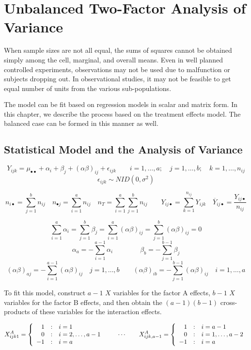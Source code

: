 \documentclass[
]{book}
\begin{document}
\chapter{Unbalanced Two-Factor Analysis of
Variance}\label{unbalanced-two-factor-analysis-of-variance}

When sample sizes are not all equal, the sums of squares cannot be
obtained simply among the cell, marginal, and overall means. Even in
well planned controlled experiments, observations may not be used due to
malfunction or subjects dropping out. In observational studies, it may
not be feasible to get equal number of units from the various
sub-populations.

The model can be fit based on regression models in scalar and matrix
form. In this chapter, we describe the process based on the treatment
effects model. The balanced case can be formed in this manner as well.

\section{Statistical Model and the Analysis of
Variance}\label{statistical-model-and-the-analysis-of-variance}

\[
Y_{ijk}=\mu_{\bullet\bullet}+\alpha_i+\beta_j+(\alpha\beta)_{ij}+\epsilon_{ijk}\qquad
i=1,\ldots,a; \quad j=1,\ldots,b; \quad k=1,\ldots,n_{ij}\]
\[\epsilon_{ijk} \sim NID\left(0,\sigma^2\right) 
\]

\[
n_{i\bullet} = \sum_{j=1}^b n_{ij}  \quad
n_{\bullet j} = \sum_{i=1}^a n_{ij}  \quad
n_T=\sum_{i=1}^a\sum_{j=1}^b n_{ij}  \qquad
Y_{ij\bullet}=\sum_{k=1}^{n_{ij}}Y_{ijk} \quad
\overline{Y}_{ij\bullet} = \frac{Y_{ij\bullet}}{n_{ij}}
\]

\[
\sum_{i=1}^a\alpha_i = \sum_{j=1}^b\beta_j = \sum_{i=1}^a(\alpha\beta)_{ij}
= \sum_{j=1}^b(\alpha\beta)_{ij} = 0
\] \[
\alpha_a=-\sum_{i=1}^{a-1}\alpha_i \qquad\qquad
\beta_b = -\sum_{j=1}^{b-1}\beta_j 
\] \[
(\alpha\beta)_{aj}=-\sum_{i=1}^{a-1}(\alpha\beta)_{ij} \quad j=1,\ldots,b
\qquad 
(\alpha\beta)_{ib}=-\sum_{j=1}^{b-1}(\alpha\beta)_{ij} \quad i=1,\ldots,a
\]

To fit this model, construct \(a-1\) \(X\) variables for the factor A
effects, \(b-1\) \(X\) variables for the factor B effects, and then
obtain the \((a-1)(b-1)\) cross-products of these variables for the
interaction effects.

\[
X_{ijk1}^A=\left\{ \begin{array}{r@{\quad:\quad}l} 
    1 & i=1 \\ 0 & i=2,\ldots,a-1\\ -1 & i=a 
    \end{array}  \right.
    \qquad \cdots \qquad
X_{ijk,a-1}^A=\left\{ \begin{array}{r@{\quad:\quad}l} 
    1 & i=a-1 \\ 0 & i=1,\ldots,a-2\\ -1 & i=a 
    \end{array}  \right.    
\]
\end{document}
